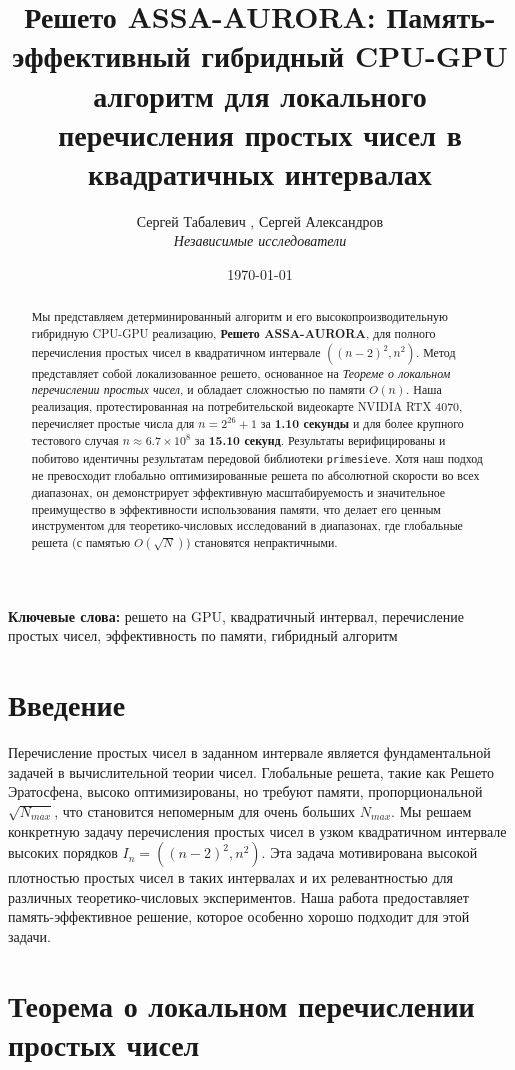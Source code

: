 \documentclass[11pt]{article}
\title{\textbf{Решето ASSA-AURORA: Память-эффективный гибридный CPU-GPU алгоритм для локального перечисления простых чисел в квадратичных интервалах}}
\author{Сергей Табалевич \orcidlink{0009-0007-4425-9443}, Сергей Александров \\ \textit{Независимые исследователи}}
\date{\today}
\begin{document}
\maketitle

\begin{abstract}
Мы представляем детерминированный алгоритм и его высокопроизводительную гибридную CPU-GPU реализацию, \textbf{Решето ASSA-AURORA}, для полного перечисления простых чисел в квадратичном интервале $((n-2)^2, n^2)$. Метод представляет собой локализованное решето, основанное на \textit{Теореме о локальном перечислении простых чисел}, и обладает сложностью по памяти $O(n)$. Наша реализация, протестированная на потребительской видеокарте NVIDIA RTX 4070, перечисляет простые числа для $n = 2^{26}+1$ за \textbf{1.10 секунды} и для более крупного тестового случая $n \approx 6.7 \times 10^8$ за \textbf{15.10 секунд}. Результаты верифицированы и побитово идентичны результатам передовой библиотеки \texttt{primesieve}. Хотя наш подход не превосходит глобально оптимизированные решета по абсолютной скорости во всех диапазонах, он демонстрирует эффективную масштабируемость и значительное преимущество в эффективности использования памяти, что делает его ценным инструментом для теоретико-числовых исследований в диапазонах, где глобальные решета (с памятью $O(\sqrt{N})$) становятся непрактичными.
\end{abstract}

\noindent\textbf{Ключевые слова:} решето на GPU, квадратичный интервал, перечисление простых чисел, эффективность по памяти, гибридный алгоритм

\section{Введение}

Перечисление простых чисел в заданном интервале является фундаментальной задачей в вычислительной теории чисел. Глобальные решета, такие как Решето Эратосфена, высоко оптимизированы, но требуют памяти, пропорциональной $\sqrt{N_{max}}$, что становится непомерным для очень больших $N_{max}$. Мы решаем конкретную задачу перечисления простых чисел в узком квадратичном интервале высоких порядков $I_n = ((n-2)^2, n^2)$. Эта задача мотивирована высокой плотностью простых чисел в таких интервалах и их релевантностью для различных теоретико-числовых экспериментов. Наша работа предоставляет память-эффективное решение, которое особенно хорошо подходит для этой задачи.

\section{Теорема о локальном перечислении простых чисел}
\end{document}
